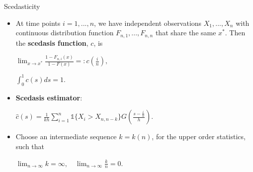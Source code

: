 \documentclass[notes]{beamer}
\begin{document}

\begin{frame}{Scedasticity}
\begin{itemize}
\item At time points $i=1, ... , n$, we have independent observations $X_1 , ... , X_n$ with continuous distribution function $F_{n,1} , ... , F_{n,n}$ that share the same $x^*$. \pause Then the \textbf{scedasis function}, $c$, is
\begin{center} $ \displaystyle \lim_{x \rightarrow x^*} \frac{1-F_{n,i}(x)}{1-F(x)} =: c\left(\frac{i}{n}\right), $ \end{center} \pause
\begin{center} $\int_0^1 c(s) ds = 1$. \end{center} \pause
\item \textbf{Scedasis estimator}:
\begin{center} $\hat{c}(s) = \frac{1}{kh} \displaystyle \sum_{i=1}^{n} \mathbb{1}\{X_i > X_{n,n-k}\} G\left(\frac{s-\frac{i}{n}}{h}\right)$. \end{center} \pause
\item Choose an intermediate sequence $k = k(n)$, for the upper order statistics, such that
\begin{center} $\displaystyle \lim_{n \rightarrow \infty} k = \infty, \quad \lim_{n \rightarrow \infty} \frac{k}{n} = 0$. \end{center}
\end{itemize}

\end{frame}
\end{document}
